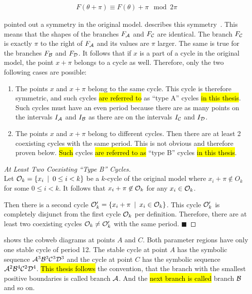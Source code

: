 \begin{align}
	F(\theta + \pi) \equiv F(\theta) + \pi \mod 2\pi \label{equ:state.og.sym}
\end{align}

 pointed out a symmetry in the original model.
 describes this symmetry~\cite{akyuz2022}.
This means that the shapes of the branches $F_{\mathcal{A}}$ and $F_{\mathcal{C}}$ are identical.
The branch $F_{\mathcal{C}}$ is exactly $\pi$ to the right of $F_{\mathcal{A}}$ and its values are $\pi$ larger.
The same is true for the branches $F_{\mathcal{B}}$ and $F_{\mathcal{D}}$.
It follows that if $x$ is a part of a cycle in the original model, the point $x + \pi$ belongs to a cycle as well.
Therefore, only the two following cases are possible:

\begin{enumerate}[label=(\Alph*)]
	\item The points $x$ and $x + \pi$ belong to the same cycle.
	      This cycle is therefore symmetric, and such cycles \hl{are referred to} as ``type A'' cycles \hl{in this thesis}.
	      Such cycles must have an even period because there are as many points on the intervals $I_{\mathcal{A}}$ and $I_{\mathcal{B}}$ as there are on the intervals $I_{\mathcal{C}}$ and $I_{\mathcal{D}}$.
	\item The points $x$ and $x + \pi$ belong to different cycles.
	      Then there are at least 2 coexisting cycles with the same period.
	      This is not obvious and therefore proven below.
	      \hl{Such} cycles \hl {are referred to as} ``type B'' cycles \hl{in this thesis}.
\end{enumerate}

\begin{proof}[At Least Two Coexisting ``Type B'' Cycles] \phantom{x} \\
	Let $\mathcal{O}_k = \left\{x_i \:\mid\: 0 \leq i < k\right\}$ be a $k$-cycle of the original model where $x_i + \pi \not\in O_k$ for some $0 \leq i < k$.
	It follows that $x_i + \pi \not\in \mathcal{O}_k$ for any $x_i \in \mathcal{O}_k$.

	Then there is a second cycle $\mathcal{O}'_k = \left\{x_i + \pi \:\mid\: x_i \in \mathcal{O}_k\right\}$.
	This cycle $\mathcal{O}'_k$ is completely disjunct from the first cycle $\mathcal{O}_k$ per definition.
	Therefore, there are at least two coexisting cycles $\mathcal{O}_k \neq \mathcal{O}'_k$ with the same period. \hfill	$\blacksquare$
\end{proof}

 shows the cobweb diagrams at points $A$ and $C$.
Both parameter regions have only one stable cycle of period 12.
The stable cycle at point $A$ has the symbolic sequence $\mathcal{A}^3\mathcal{B}^3\mathcal{C}^3\mathcal{D}^3$ and the cycle at point $C$ has the symbolic sequence $\mathcal{A}^2\mathcal{B}^4\mathcal{C}^2\mathcal{D}^4$.
\hl{This thesis follows} the convention, that the branch with the smallest positive boundaries is called branch $\mathcal{A}$.
And the \hl{next branch is called} branch $\mathcal{B}$ and so on.


